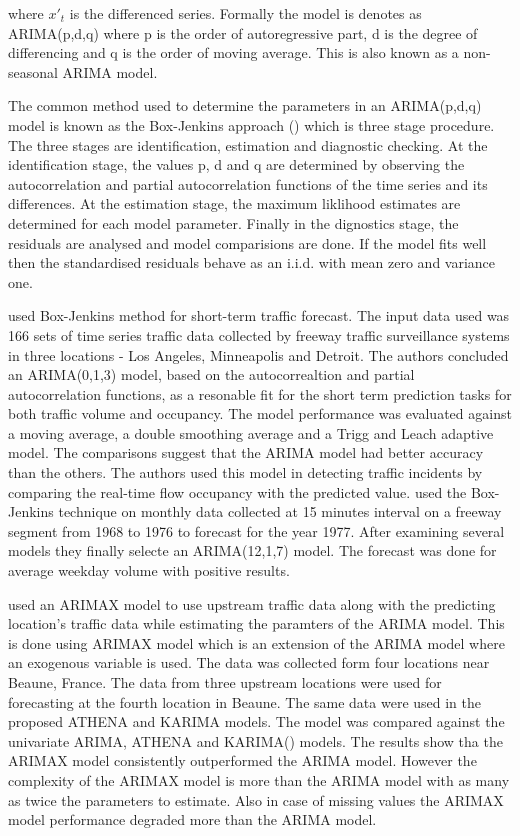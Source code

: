 where $x'_{t}$ is the differenced series. Formally the model is denotes as ARIMA(p,d,q) where p
is the order of autoregressive part, d is the degree of differencing and q is the order of moving
average. This is also known as a non-seasonal ARIMA model.

The common method used to determine the parameters in an ARIMA(p,d,q) model is known as the
Box-Jenkins approach (\citet{box2015time}) which is three stage procedure. The three stages are
identification, estimation and diagnostic checking. At the identification stage, the values p, d
and q are determined by observing the autocorrelation and partial autocorrelation functions of
the time series and its differences. At the estimation stage, the maximum liklihood estimates are
determined for each model parameter. Finally in the dignostics stage, the residuals are analysed
and model comparisions are done. If the model fits well then the standardised residuals behave as
an i.i.d. with mean zero and variance one.

\citet{ahmed1979analysis} used Box-Jenkins method for short-term traffic forecast. The input data
used was 166 sets of time series traffic data collected by freeway traffic surveillance systems in
three locations - Los Angeles, Minneapolis and Detroit. The authors concluded an ARIMA(0,1,3)
model, based on the autocorrealtion and partial autocorrelation functions, as a resonable fit for
the short term prediction tasks for both traffic volume and occupancy. The model performance was
evaluated against a moving average, a double smoothing average and a Trigg and Leach adaptive
model. The comparisons suggest that the ARIMA model had better accuracy than the others. The
authors used this model in detecting traffic incidents by comparing the real-time flow occupancy
with the predicted value. \citet{nihan1980use} used the Box-Jenkins technique on monthly data
collected at 15 minutes interval on a freeway segment from 1968 to 1976 to forecast for the year
1977. After examining several models they finally selecte an ARIMA(12,1,7) model. The forecast
was done for average weekday volume with positive results.

\citet{williams2001multivariate} used an ARIMAX model to use upstream traffic data along with the
predicting location's traffic data while estimating the paramters of the ARIMA model. This is
done using ARIMAX model which is an extension of the ARIMA model where an exogenous variable is
used. The data was collected form four locations near Beaune, France. The data from three upstream
locations were used for forecasting at the fourth location in Beaune. The same data were used
in the proposed ATHENA and KARIMA models. The model was compared  against the univariate ARIMA,
ATHENA\citet{danech1991athena} and KARIMA(\citet{van1996combining}) models. The results show tha
the ARIMAX model consistently outperformed the ARIMA model. However the complexity of the ARIMAX
model is more than the ARIMA model with as many as twice the parameters to estimate. Also in case
of missing values the ARIMAX model performance degraded more than the ARIMA model.

